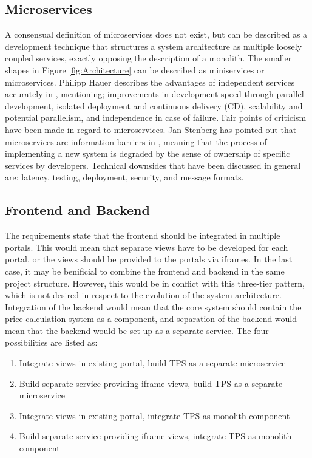 \subsection{Microservices}
A consensual definition of microservices does not exist, but can be described as a development technique that structures a system architecture as multiple loosely coupled services, exactly opposing the description of a monolith. The smaller shapes in Figure \ref{fig:Architecture} can be described as miniservices or microservices. Philipp Hauer describes the advantages of independent services accurately in \cite{microservices}, mentioning; improvements in development speed through parallel development, isolated deployment and continuous delivery (CD), scalability and potential parallelism, and independence in case of failure. Fair points of criticism have been made in regard to microservices. Jan Stenberg has pointed out that microservices are information barriers in \cite{JS-microservices}, meaning that the process of implementing a new system is degraded by the sense of ownership of specific services by developers. Technical downsides that have been discussed in general are: latency, testing, deployment, security, and message formats.

\subsection{Frontend and Backend}
The requirements state that the frontend should be integrated in multiple portals. This would mean that separate views have to be developed for each portal, or the views should be provided to the portals via iframes. In the last case, it may be benificial to combine the frontend and backend in the same project structure. However, this would be in conflict with this three-tier pattern, which is not desired in respect to the evolution of the system architecture. Integration of the backend would mean that the core system should contain the price calculation system as a component, and separation of the backend would mean that the backend would be set up as a separate service. The four possibilities are listed as:

\begin{enumerate}
	\item Integrate views in existing portal, build TPS as a separate microservice
	\item Build separate service providing iframe views, build TPS as a separate microservice
	\item Integrate views in existing portal, integrate TPS as monolith component
	\item Build separate service providing iframe views, integrate TPS as monolith component
\end{enumerate}

